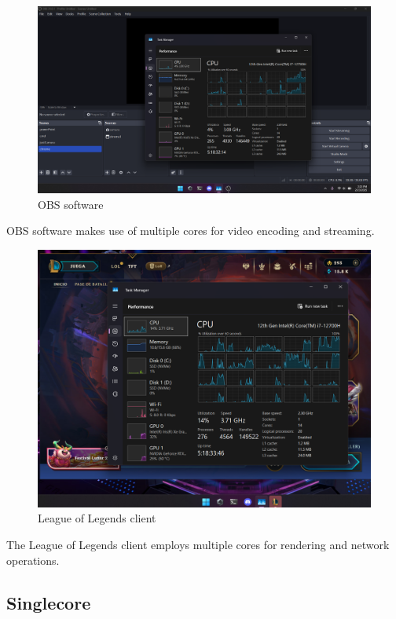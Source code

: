 \documentclass{article}
\begin{document}
\begin{figure}[H]
\centering
\includegraphics[width=1\textwidth]{imgs/mu2.png}
\caption{OBS software}
\label{fig:2}
\end{figure}
OBS software makes use of multiple cores for video encoding and streaming.

\begin{figure}[H]
\centering
\includegraphics[width=1\textwidth]{imgs/mu3.png}
\caption{League of Legends client}
\label{fig:3}
\end{figure}
The League of Legends client employs multiple cores for rendering and network operations.

\subsection*{Singlecore}
\end{document}
